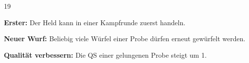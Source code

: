 \documentclass{dsa5einleger}
\begin{document}
\begin{dsaReihe}
{  


  \begin{dsaPergament}{1}{9}
    \begin{dsaliste}
      \item \textbf{Erster:} Der Held kann in einer Kampfrunde zuerst
        handeln.
      \item \textbf{Neuer Wurf:} Beliebig viele Würfel einer Probe dürfen
        erneut gewürfelt werden.
      \item \textbf{Qualität verbessern:} Die QS einer gelungenen Probe
        steigt um 1.
    \end{dsaliste}
  \end{dsaPergament}
}

\end{dsaReihe}

\newpage

\end{document}
